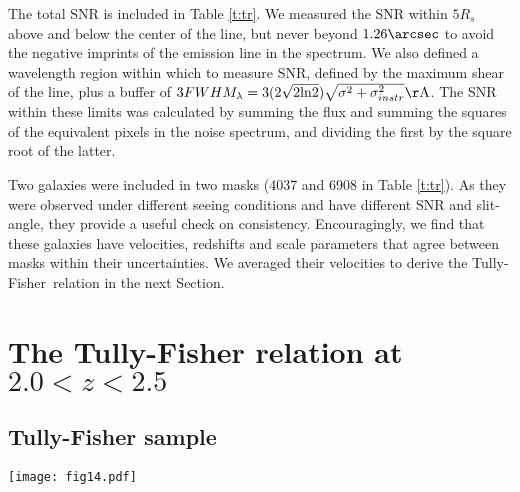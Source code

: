\documentclass{emulateapj}
\newcommand{\A}{\mathrm{\AA}}
\newcommand{\tf}{Tully-Fisher}
\begin{document}
The total SNR is included in Table \ref{t:tr}. We measured the SNR within $5R_s$ above and below the center of the line, but never beyond $1.26\arcsec$ to avoid the negative imprints of the emission line in the spectrum. We also defined a wavelength region within which to measure SNR, defined by the maximum shear of the line, plus a buffer of $3FWHM_{\lambda}=3(2\sqrt{2\mathrm{ln}2})\sqrt{\sigma^2+\sigma_{instr}^2}\A$. The SNR within these limits was calculated by summing the flux and summing the squares of the equivalent pixels in the noise spectrum, and dividing the first by the square root of the latter. 

{Two} galaxies were included in two masks (4037 and 6908 in Table \ref{t:tr}). As they were observed under different seeing conditions and have different SNR and slit-angle, they provide a useful check on consistency. Encouragingly, we find that these galaxies have velocities, redshifts and scale parameters that agree between masks within their uncertainties. We averaged their velocities to derive the \tf\ relation in the next Section.


\section{The Tully-Fisher relation at $2.0<z<2.5$}\label{sec:tf22}

\subsection{Tully-Fisher sample}\label{sec:tfsample}
 
\begin{figure*}
\begin{center}
\vspace{20pt}
\texttt{[image: fig14.pdf]}
\caption{{HST/WFC3/}F160W images of the galaxies in our \tf\ sample. {The green box shows the dimensions and orientation of the slit compared to the galaxies. The dotted line indicates the PA of the major axis.}}
\label{fig:stamps}
\end{center}
\end{figure*}
\end{document}
